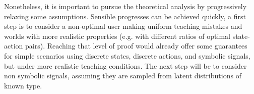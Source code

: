 
Nonetheless, it is important to pursue the theoretical analysis by progressively relaxing some assumptions. Sensible progresses can be achieved quickly, a first step is to consider a non-optimal user making uniform teaching mistakes and worlds with more realistic properties (e.g. with different ratios of optimal state-action pairs). Reaching that level of proof would already offer some guarantees for simple scenarios using discrete states, discrete actions, and symbolic signals, but under more realistic teaching conditions. The next step will be to consider non symbolic signals, assuming they are sampled from latent distributions of known type.
